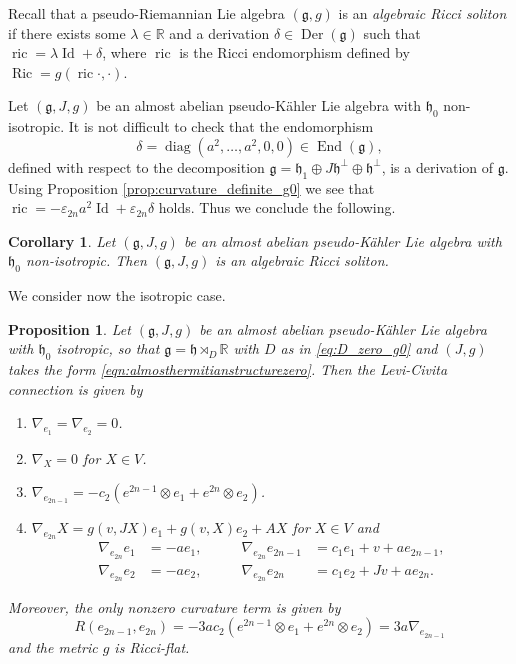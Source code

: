 \documentclass{article}
\newtheorem{corollary}[theorem]{Corollary}
\newtheorem{proposition}[theorem]{Proposition}
\theoremstyle{definition}
\DeclareMathOperator{\Id}{Id}
\DeclareMathOperator{\End}{End}
\DeclareMathOperator{\Der}{Der}
\DeclareMathOperator{\Ric}{Ric}
\DeclareMathOperator{\ric}{ric}
\newcommand{\R}{\mathbb{R}}
\newcommand{\frg}{\mathfrak{g}}
\newcommand{\frh}{\mathfrak{h}}
\newcommand{\lie}[1]{\mathfrak{#1}}
\newcommand{\g}{\lie g}
\newcommand{\h}{\lie h}
\begin{document}
Recall that a pseudo-Riemannian Lie algebra $(\frg,g)$ is an \emph{algebraic Ricci soliton} if there exists some $\lambda\in\R$ and a derivation $\delta\in\Der(\frg)$ such that $\ric=\lambda\Id+\delta$, where $\ric$ is the Ricci endomorphism defined by $\Ric=g(\ric\cdot,\cdot)$.\medskip

Let $(\frg,J,g)$ be an almost abelian pseudo-Kähler Lie algebra with $\frh_0$ non-isotropic. It is not difficult to check that the endomorphism $$\delta=\operatorname{diag}(a^2,\ldots,a^2,0,0)\in\End(\frg),$$ defined with respect to the decomposition $\frg=\frh_1\oplus J\frh^\perp\oplus\frh^\perp$, is a derivation of $\frg$. Using Proposition \ref{prop:curvature_definite_g0} we see that $\ric=-\varepsilon_{2n}a^2\Id+\varepsilon_{2n}\delta$ holds. Thus we conclude the following.

\begin{corollary}\label{cor:Ricci_soliton}
    Let $(\frg,J,g)$ be an almost abelian pseudo-Kähler Lie algebra with $\frh_0$ non-isotropic. Then $(\frg,J,g)$ is an algebraic Ricci soliton.
\end{corollary}

We consider now the isotropic case.

\begin{proposition}\label{prop:curvature_isotropic_h0}
    Let $(\frg,J,g)$ be an almost abelian pseudo-Kähler Lie algebra with $\frh_0$ isotropic, so that $\g=\h\rtimes_D\R$ with $D$ as in \eqref{eq:D_zero_g0} and $(J,g)$ takes the form \eqref{eqn:almosthermitianstructurezero}. Then the Levi-Civita connection is given by \begin{enumerate}
        \item $\nabla_{e_1}=\nabla_{e_2}=0$.
        \item $\nabla_X=0$ for $X\in V$.
        \item $\nabla_{e_{2n-1}}=-c_2(e^{2n-1}\otimes e_1+e^{2n}\otimes e_2)$.
        \item $\nabla_{e_{2n}}X=g(v,JX)e_1+g(v,X)e_2+AX$ for $X\in V$ and $$\begin{aligned}
            \nabla_{e_{2n}}e_1&=-ae_1,\\
            \nabla_{e_{2n}}e_2&=-ae_2,
        \end{aligned}\qquad\begin{aligned}
            \nabla_{e_{2n}}e_{2n-1}&=c_1e_1+v+ae_{2n-1},\\
            \nabla_{e_{2n}}e_{2n}&=c_1e_2+Jv+ae_{2n}.
        \end{aligned}$$
    \end{enumerate}

    Moreover, the only nonzero curvature term is given by $$R(e_{2n-1},e_{2n})=-3ac_2(e^{2n-1}\otimes e_1+e^{2n}\otimes e_2)=3a\nabla_{e_{2n-1}}$$ and the metric $g$ is Ricci-flat.
\end{proposition}
\end{document}
